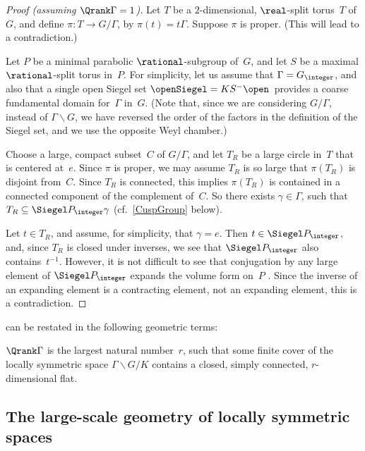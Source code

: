 \begin{proof}[Proof \normalfont(assuming $\Qrank \Gamma = 1$)]
Let $T$ be a $2$-dimensional, $\real$-split torus~$T$ of~$G$, and define $\pi \colon T \to G/\Gamma$, by $\pi(t) = t \Gamma$. Suppose $\pi$ is proper. (This will lead to a contradiction.)

Let $P$ be a minimal parabolic $\rational$-subgroup of~$G$, and let $S$ be a maximal $\rational$-split torus in~$P$. For simplicity, let us assume that $\Gamma = G_{\integer}$, and also that a single open Siegel set $\openSiegel = K S^- \open$\, provides a coarse fundamental domain for~$\Gamma$ in~$G$. (Note that, since we are considering $G/\Gamma$, instead of $\Gamma \backslash G$, we have reversed the order of the factors in the definition of the Siegel set, and we use the opposite Weyl chamber.)

Choose a large, compact subset~$C$ of $G/\Gamma$, and let $T_R$ be a large circle in~$T$ that is centered at~$e$. Since $\pi$ is proper, we may assume $T_R$ is so large that $\pi(T_R)$ is disjoint from~$C$. Since $T_R$ is connected, this implies $\pi(T_R)$ is contained in a connected component of the complement of~$C$. So there exists $\gamma \in \Gamma$, such that $T_R \subseteq \Siegel P_{\integer}  \gamma$ (cf.\ \cref{CuspGroup} below). 

Let $t \in T_R$, and assume, for simplicity, that $\gamma = e$. Then $t \in \Siegel P_{\integer}$, and, since $T_R$ is closed under inverses, we see that $\Siegel P_{\integer}$ also contains~$t^{-1}$. However, it is not difficult to see that conjugation by any large element of $\Siegel P_{\integer}$ expands the volume form on~$P$ . Since the inverse of an expanding element is a contracting element, not an expanding element, this is a contradiction.
\end{proof}

 can be restated in the following geometric terms:

\begin{thm}
$\Qrank \Gamma$ is the largest natural number~$r$, such
that some finite cover of the locally symmetric space\/ $\Gamma \backslash G/K$ contains a closed, simply connected, $r$-dimensional flat.
 \end{thm}




\subsection{The large-scale geometry of locally symmetric spaces} \label{LargeScaleSect}

